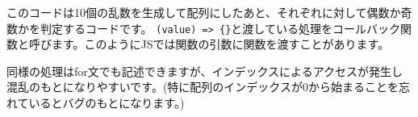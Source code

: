 \begin{Shaded}
\begin{Highlighting}[]
\OperatorTok{=}\NormalTok{ []}\OperatorTok{;}
\NormalTok{ (}\OperatorTok{=} \OperatorTok{;}\OperatorTok{\textless{}} \OperatorTok{;}\OperatorTok{++}\NormalTok{) \{}
\NormalTok{(}\NormalTok{(}\NormalTok{() }\OperatorTok{*}  \OperatorTok{*}\OperatorTok{;}
\NormalTok{\}}

\KeywordTok{=\textgreater{}}\NormalTok{ \{}
  \OperatorTok{\%}  \OperatorTok{===} \NormalTok{) \{}
    \NormalTok{(}\VerbatimStringTok{\textasciigrave{}}\SpecialCharTok{$\{}\SpecialCharTok{\}}\NormalTok{)}\OperatorTok{;}
\NormalTok{  \} }\NormalTok{ \{}
    \NormalTok{(}\VerbatimStringTok{\textasciigrave{}}\SpecialCharTok{$\{}\SpecialCharTok{\}}\NormalTok{)}\OperatorTok{;}
\NormalTok{  \}}
\NormalTok{\})}\OperatorTok{;}
\end{Highlighting}
\end{Shaded}

このコードは10個の乱数を生成して配列にしたあと、それぞれに対して偶数か奇数かを判定するコードです。
\texttt{(value)\ =\textgreater{}\ \{\}}と渡している処理をコールバック関数と呼びます。このようにJSでは関数の引数に関数を渡すことがあります。

同様の処理はfor文でも記述できますが、インデックスによるアクセスが発生し混乱のもとになりやすいです。(特に配列のインデックスが0から始まることを忘れているとバグのもとになります。)

